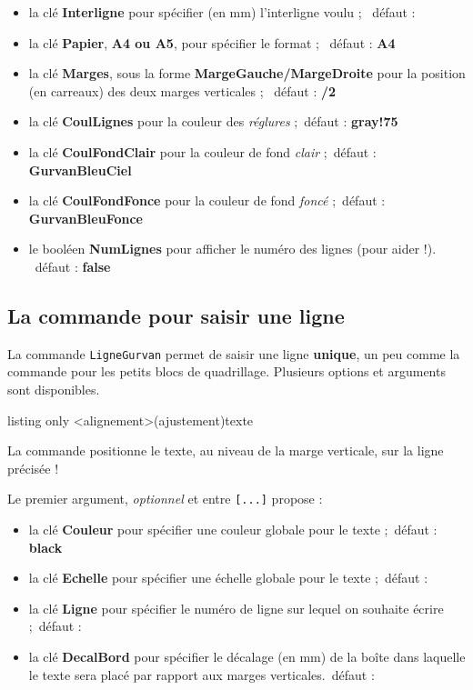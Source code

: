 \documentclass[a4paper]{article}
\newcommand\Cle[1]{{\bfseries\sffamily\textlangle #1\textrangle}}
\begin{document}
\begin{itemize}
	\item la clé \Cle{Interligne} pour spécifier (en mm) l'interligne voulu ; \hfill~défaut : \Cle{3}
	\item la clé \Cle{Papier}, \Cle{A4 ou A5}, pour spécifier le format ; \hfill~défaut : \Cle{A4}
	\item la clé \Cle{Marges}, sous la forme \Cle{MargeGauche/MargeDroite} pour la position (en carreaux) des deux marges verticales ; \hfill~défaut : \Cle{5/2}
	\item la clé \Cle{CoulLignes} pour la couleur des \textit{réglures} ;\hfill~défaut : \Cle{gray!75}
	\item la clé \Cle{CoulFondClair} pour la couleur de fond \textit{clair} ;\hfill~défaut : \Cle{GurvanBleuCiel}
	\item la clé \Cle{CoulFondFonce} pour la couleur de fond \textit{foncé} ;\hfill~défaut : \Cle{GurvanBleuFonce}
	
	\item le booléen \Cle{NumLignes} pour afficher le numéro des lignes (pour aider !). \hfill~défaut : \Cle{false}
\end{itemize}

\subsection{La commande pour saisir une ligne}

La commande \texttt{LigneGurvan} permet de saisir une ligne \textbf{unique}, un peu comme la commande pour les petits blocs de quadrillage. Plusieurs options et arguments sont disponibles.

\begin{PresentationCode}{listing only}
\LigneGurvan[options]<alignement>(ajustement){texte}
\end{PresentationCode}

La commande positionne le \textsf{texte}, au niveau de la marge verticale, sur la ligne précisée !

\smallskip

Le premier argument, \textit{optionnel} et entre \texttt{[...]} propose :

\begin{itemize}
	\item la clé \Cle{Couleur} pour spécifier une couleur globale pour le texte ;\hfill~défaut : \Cle{black}
	\item la clé \Cle{Echelle} pour spécifier une échelle globale pour le texte ;\hfill~défaut : \Cle{1}
	\item la clé \Cle{Ligne} pour spécifier le numéro de ligne sur lequel on souhaite écrire ;\hfill~défaut : \Cle{1}
	\item la clé \Cle{DecalBord} pour spécifier le décalage (en mm) de la boîte dans laquelle le texte sera placé par rapport aux marges verticales.\hfill~défaut : \Cle{0}
\end{itemize}
\end{document}

